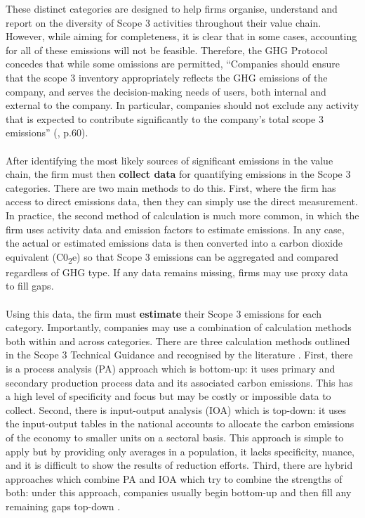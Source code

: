\documentclass[12pt,twoside]{report}
\begin{document}
These distinct categories are designed to help firms organise, understand and report on the diversity of Scope 3 activities throughout their value chain. However, while aiming for completeness, it is clear that in some cases, accounting for all of these emissions will not be feasible.  Therefore, the GHG Protocol concedes that while some omissions are permitted, ``Companies should ensure that the scope 3 inventory appropriately reflects the GHG emissions of the company, and serves the decision-making needs of users, both internal and external to the company. In particular, companies should not exclude any activity that is expected to contribute significantly to the company's total scope 3 emissions'' (\cite{ghgscope32013}, p.60).  
\\ \\
After identifying the most likely sources of significant emissions in the value chain, the firm must then \textbf{collect data} for quantifying emissions in the Scope 3 categories. There are two main methods to do this. First, where the firm has access to direct emissions data, then they can simply use the direct measurement. In practice, the second method of calculation is much more common, in which the firm uses activity data and emission factors to estimate emissions. In any case, the actual or estimated emissions data is then converted into a carbon dioxide equivalent (C0\textsubscript{2}e) so that Scope 3 emissions can be aggregated and compared regardless of GHG type. If any data remains missing, firms may use proxy data to fill gaps. 
\\ \\
Using this data, the firm must \textbf{estimate} their Scope 3 emissions for each category. Importantly, companies may use a combination of calculation methods both within and across categories. There are three calculation methods outlined in the Scope 3 Technical Guidance and recognised by the literature \cite{ghgscope32013, GoldhammerEtAl2017}. First, there is a process analysis (PA) approach which is bottom-up: it uses primary and secondary production process data and its associated carbon emissions. This has a high level of specificity and focus but may be costly or impossible data to collect. Second, there is input-output analysis (IOA) which is top-down: it uses the input-output tables in the national accounts to allocate the carbon emissions of the economy to smaller units on a sectoral basis. This approach is simple to apply but by providing only averages in a population, it lacks specificity, nuance, and it is difficult to show the results of reduction efforts. Third, there are hybrid approaches which combine PA and IOA which try to combine the strengths of both: under this approach, companies usually begin bottom-up and then fill any remaining gaps top-down \cite{Crawford2008}. 
\end{document}
